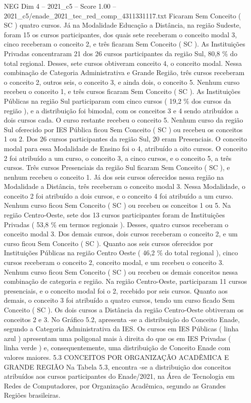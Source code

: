\begin{textsample}{NEG Dim 4 – 2021\_c5 – Score 1.00 – 2021\_c5/enade\_2021\_tec\_red\_comp\_4311331117.txt}
Ficaram Sem Conceito ( SC ) quatro cursos.
Já na Modalidade Educação a Distância, na região Sudeste, foram 15 os cursos participantes, dos quais sete receberam o conceito modal 3, cinco receberam o conceito 2, e três ficaram Sem Conceito ( SC ).
As Instituições Privadas concentraram 21 dos 26 cursos participantes da região Sul, 80,8 \% do total regional.
Desses, sete cursos obtiveram conceito 4, o conceito modal.
Nessa combinação de Categoria Administrativa e Grande Região, três cursos receberam o conceito 2, outros seis, o conceito 3, e ainda dois, o conceito 5.
Nenhum curso recebeu o conceito 1, e três cursos ficaram Sem Conceito ( SC ).
As Instituições Públicas na região Sul participaram com cinco cursos ( 19,2 \% dos cursos da região ), e a distribuição foi bimodal, com os conceitos 3 e 4 sendo atribuídos a dois cursos cada.
O curso restante recebeu o conceito 5.
Nenhum curso da região Sul oferecido por IES Pública ficou Sem Conceito ( SC ) ou recebeu os conceitos 1 ou 2.
Dos 26 cursos participantes da região Sul, 20 eram Presenciais.
O conceito modal para essa Modalidade de Ensino foi o 4, atribuído a oito cursos.
O conceito 2 foi atribuído a um curso, o conceito 3, a cinco cursos, e o conceito 5, a três cursos.
Três cursos Presenciais da região Sul ficaram Sem Conceito ( SC ), e nenhum recebeu o conceito 1.
Já dos seis cursos oferecidos nessa região na Modalidade a Distância, três receberam o conceito modal 3.
Nessa Modalidade, o conceito 2 foi atribuído a dois cursos, e o conceito 4 foi atribuído a um curso.
Nenhum curso ficou Sem Conceito ( SC ) ou recebeu os conceitos 1 ou 5.
Na região Centro-Oeste, sete dos 13 cursos participantes foram de Instituições Privadas ( 53,8 \% em termos regionais ).
Desses, quatro cursos receberam o conceito modal 3.
Dos demais cursos, dois cursos receberam o conceito 2, e um curso ficou Sem Conceito ( SC ).
Quanto aos seis cursos oferecidos por Instituições Públicas na região Centro Oeste ( 46,2 \% do total regional ), cinco cursos receberam o conceito 2, conceito modal, e um recebeu o conceito 3.
Nenhum curso ficou Sem Conceito ( SC ) ou recebeu os demais conceitos nessa combinação de categoria e região.
Na região Centro-Oeste, participaram 11 cursos presenciais, e o conceito modal foi o 2, recebido por seis cursos.
Quanto aos demais, o conceito 3 foi atribuído a quatro cursos, tendo um curso ficado Sem Conceito ( SC ).
Os dois cursos a Distância da região Centro-Oeste obtiveram os conceitos 2 e 3.
No Gráfico 5.2, apresenta -se a distribuição do Conceito Enade, segundo a Categoria Administrativa da IES.
Os cursos em IES Públicas ( linha azul ) apresentam uma poligonal mais à direita do que os em IES Privadas ( linha verde ) e, consequentemente, uma distribuição de Conceito Enade com valores maiores. 5.3 CONCEITOS POR ORGANIZAÇÃO ACADÊMICA E GRANDE REGIÃO Na Tabela 5.3, encontra -se a distribuição dos conceitos atribuídos aos cursos participantes do Enade/2021, na Área de Tecnologia em Redes de Computadores, por Organização Acadêmica, segundo as Grandes Regiões brasileiras.

\end{textsample}
